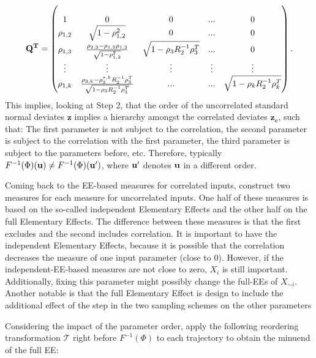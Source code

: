 \documentclass[a4paper,12pt]{article}
\begin{document}
\begin{align}
\bold{Q^T} =
\begin{pmatrix}
\\ 1 & 0 & 0 & ... & 0
\\\rho_{1,2} & \sqrt{1-\rho_{1,2}^2} & 0 & ... & 0
\\ \rho_{1,3} & \frac{\rho_{2,3}-\rho_{1,2}\rho_{1,3}}{\sqrt{1-\rho_{1,2}^2}} & \sqrt{1-\rho_{3}R^{-1}_2\rho_{3}^T} & ... & 0
\\\vdots & \vdots & \vdots & \vdots & \vdots
\\ \rho_{1,k} & \frac{\rho_{3,k}-\rho_{3}^{*,k}R^{-1}_2\rho_{3}^T}{\sqrt{1-\rho_{3}R^{-1}_2\rho_{3}^T}} & ... &
... & \sqrt{1-\rho_{k}R^{-1}_2\rho_{k}^T}
\end{pmatrix}.
\end{align}
This implies, looking at Step 2, that the order of the uncorrelated standard normal deviates $\pmb{z}$ implies a hierarchy amongst the correlated deviates $\pmb{z_c}$, such that: The first parameter is not subject to the correlation, the second parameter is subject to the correlation with the first parameter, the third parameter is subject to the parameters before, etc. Therefore, typically $F^{-1}(\Phi)(\bold{u}) \neq F^{-1}(\Phi)(\bold{u'})$, where $\bold{u'}$ denotes $\bold{u}$ in a different order.

Coming back to the EE-based measures for correlated inputs, \cite{ge2017extending} construct two measures for each measure for uncorrelated inputs. One half of these measures is based on the so-called independent Elementary Effects and the other half on the full Elementary Effects. The difference between these measures is that the first excludes and the second includes correlation. It is important to have the independent Elementary Effects, because it is possible that the correlation decreases the measure of one input parameter (close to 0). However, if the independent-EE-based measures are not close to zero, $X_i$ is still important. Additionally, fixing this parameter might possibly change the full-EEs of $X_{\sim i}$. Another notable is that the full Elementary Effect is design to include the additional effect of the step in the two sampling schemes on the other parameters

Considering the impact of the parameter order, \cite{ge2017extending} apply the following reordering transformation $\mathcal{T}$ right before $F^{-1}(\Phi)$ to each trajectory to obtain the minuend of the full EE:
\end{document}
